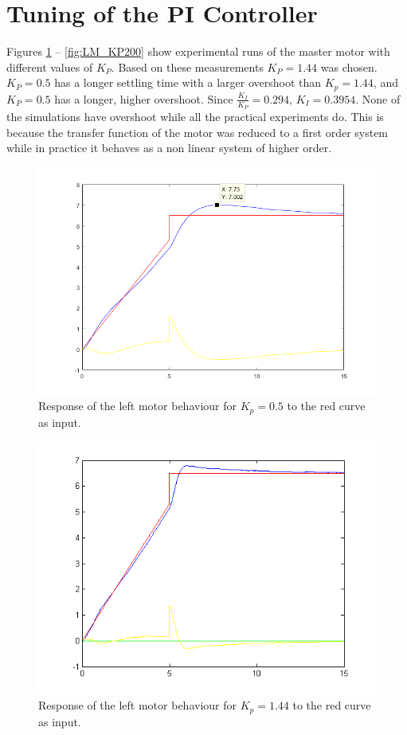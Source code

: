 \FloatBarrier
\section{Tuning of the PI Controller}
Figures \ref{fig:LM_KP050} -- \ref{fig:LM_KP200} show experimental runs of the master motor with different values of $K_P$. Based on these measurements $K_P = 1.44$ was chosen. $K_P = 0.5$ has a longer settling time with a larger overshoot than $K_p = 1.44$, and $K_P = 0.5$ has a longer, higher overshoot.  Since $\frac{K_I}{K_P} = 0.294$, $K_I = 0.3954$. None of the simulations have overshoot while all the practical experiments do. This is because the transfer function of the motor was reduced to a first order system while in practice it behaves as a non linear system of higher order.
\begin{figure}[htbp]
\centering
\includegraphics[width = .7\textwidth]{pics/LM_KP050a.png}
\caption{Response of the left motor behaviour for $K_p = 0.5$ to the red curve as input.}
\label{fig:LM_KP050}
\end{figure}
%
\begin{figure}[htbp]
\centering
\includegraphics[width = \textwidth]{pics/LM_KP144.png}
\caption{Response of the left motor behaviour for $K_p = 1.44$ to the red curve as input.}
\label{fig:LM_KP144}
\end{figure}
